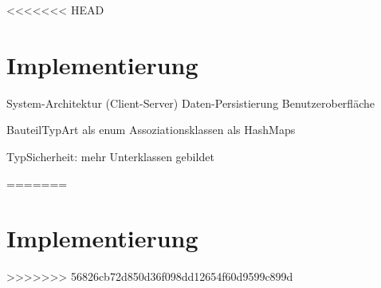 <<<<<<< HEAD
\section{Implementierung}
\label{sec:fachkonzept-implementierung}

System-Architektur (Client-Server)
Daten-Persistierung
Benutzeroberfläche

BauteilTypArt als enum
Assoziationsklassen als HashMaps

TypSicherheit: mehr Unterklassen gebildet









=======
\section{Implementierung}
\label{sec:fachkonzept-implementierung}











>>>>>>> 56826cb72d850d36f098dd12654f60d9599c899d
